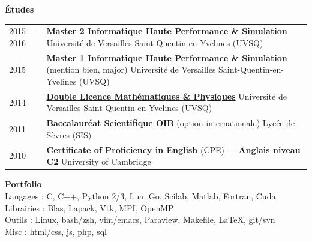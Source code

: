 {\large\bf Études}
\hrulefill\\[.3cm]
{\setlength{\extrarowheight}{.2cm}
\begin{tabularx}{\textwidth}{lX}
2015 \---- 2016 &
\href{http://mihps.prism.uvsq.fr}
{\bf Master 2 Informatique Haute Performance \& Simulation}
\newline
Université de Versailles Saint-Quentin-en-Yvelines (UVSQ) \\
2015 &
\href{http://mihps.prism.uvsq.fr}
{\bf Master 1 Informatique Haute Performance \& Simulation}
(mention bien, major)
\newline
Université de Versailles Saint-Quentin-en-Yvelines (UVSQ) \\
2014 &
\href{http://www.uvsq.fr/double-licence-mathematiques-et-physique-343617.kjsp}
{\bf Double Licence Mathématiques \& Physiques}
\newline
Université de Versailles Saint-Quentin-en-Yvelines (UVSQ) \\
2011 &
\href{http://www.education.gouv.fr/cid20999/l-option-internationale-du-baccalaureat-o.i.b.html}
{\bf Baccalauréat Scientifique OIB} (option internationale)
\newline
Lycée de Sèvres (SIS) \\
2010 &
\href{http://www.cambridgeenglish.org/exams/proficiency/}
{\bf Certificate of Proficiency in English} (CPE)
\---- {\bf Anglais niveau C2}
\newline
University of Cambridge
\end{tabularx}}
\vspace{.3cm}

{\large\bf Portfolio}
\hrulefill\\[.2cm]
Langages : C, C++, Python 2/3, Lua, Go, Scilab, Matlab, Fortran, Cuda \\
Librairies : Blas, Lapack, Vtk, MPI, OpenMP \\
Outils : Linux, bash/zsh, vim/emacs, Paraview, Makefile, \LaTeX, git/svn \\
Misc : html/css, js, php, sql
\vspace{.3cm}

